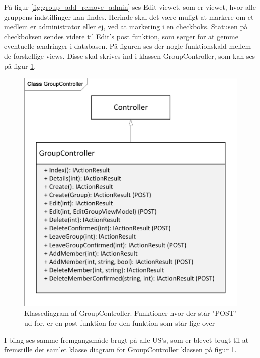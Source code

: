 På figur \ref{fig:group_add_remove_admin} ses Edit viewet, som er viewet, hvor alle gruppens indstillinger kan findes. Herinde skal det være muligt at markere om et medlem er administrator eller ej, ved at markering i en checkboks. Statusen på checkboksen sendes videre til Edit's post funktion, som sørger for at gemme eventuelle ændringer i databasen. På figuren ses der nogle funktionskald mellem de forskellige views. Disse skal skrives ind i klassen GroupController, som kan ses på figur \ref{fig:group_logical_class}.

\begin{figure}[H]
  \includegraphics[scale=0.8]{01_Billeder/09_Arkitektur/Group/LogicalView_Class.png}
  \centering
  \caption{Klassediagram af GroupController. Funktioner hvor der står "POST" ud for, er en post funktion for den funktion som står lige over}
  \label{fig:group_logical_class}
\end{figure}

I bilag  ses samme fremgangsmåde brugt på alle US's, som er blevet brugt til at fremstille det samlet klasse diagram for GroupController klassen på figur \ref{fig:group_logical_class}.